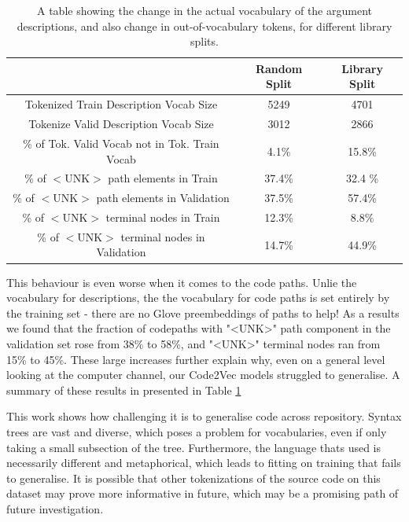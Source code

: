 \begin{table}
    \begin{center}
        \begin{tabular}{c c c}
           \hline
            & Random Split & Library Split \\
            \hline
            Tokenized Train Description Vocab Size    & 5249  &  4701 \\
            Tokenize Valid Description Vocab Size    & 3012  &  2866 \\
            \% of Tok. Valid Vocab not in Tok. Train Vocab                & 4.1\% &  15.8\% \\
            \hline
            \% of $<$UNK$>$ path elements in Train          &  37.4\%  &  32.4 \%   \\
            \% of $<$UNK$>$ path elements in Validation     &  37.5\%  &  57.4\% \\
            \% of $<$UNK$>$ terminal nodes in Train         &  12.3\%  &  8.8\%  \\ 
            \% of $<$UNK$>$ terminal nodes in Validation    &  14.7\% &  44.9\% \\   
            \hline
        \end{tabular}
    \end{center}
    \caption{A table showing the change in the actual vocabulary of the argument descriptions, and also change in out-of-vocabulary tokens, for different library splits.}
    \label{tab:vocabsplit}
\end{table}



This behaviour is even worse when it comes to the code paths.
Unlie the vocabulary for descriptions, the the vocabulary for code paths is set entirely by the training set - there are no Glove preembeddings of paths to help!
As a results we found that the fraction of codepaths with "<UNK>" path component in the validation set rose from 38\% to 58\%, and "<UNK>" terminal nodes ran from 15\% to 45\%. 
These large increases further explain why, even on a general level looking at the computer channel, our Code2Vec models struggled to generalise. A summary of these results in presented in Table \ref{tab:vocabsplit}

This work shows how challenging it is to generalise code across repository. Syntax trees are vast and diverse, which poses a problem for vocabularies, even if only taking a small subsection of the tree. 
Furthermore, the language thats used is necessarily different and metaphorical, which leads to fitting on training that fails to generalise.
It is possible that other tokenizations of the source code on this dataset may prove more informative in future, which may be a promising path of future investigation.



